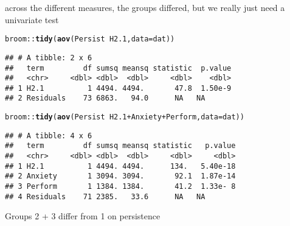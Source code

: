 \documentclass{article}\usepackage[]{graphicx}\usepackage[]{color}
\makeatletter
\newcommand{\hlopt}[1]{\textcolor[rgb]{0,0,0}{#1}}%
\newcommand{\hlstd}[1]{\textcolor[rgb]{0.345,0.345,0.345}{#1}}%
\newcommand{\hlkwc}[1]{\textcolor[rgb]{0.333,0.667,0.333}{#1}}%
\newcommand{\hlkwd}[1]{\textcolor[rgb]{0.737,0.353,0.396}{\textbf{#1}}}%
\newenvironment{kframe}{%
 \def\at@end@of@kframe{}%
 \ifinner\ifhmode%
  \def\at@end@of@kframe{\end{minipage}}%
  \begin{minipage}{\columnwidth}%
 \fi\fi%
 \def\FrameCommand##1{\hskip\@totalleftmargin \hskip-\fboxsep
 \colorbox{shadecolor}{##1}\hskip-\fboxsep
     \hskip-\linewidth \hskip-\@totalleftmargin \hskip\columnwidth}%
 \MakeFramed {\advance\hsize-\width
   \@totalleftmargin\z@ \linewidth\hsize
   \@setminipage}}%
 {\par\unskip\endMakeFramed%
 \at@end@of@kframe}
\newenvironment{knitrout}{}{} %
\makeatother
\begin{document}
across the different measures, the groups differed, but we really just need a univariate test

\begin{knitrout}
\color{fgcolor}\begin{kframe}
\begin{alltt}
\hlstd{broom}\hlopt{::}\hlkwd{tidy}\hlstd{(}\hlkwd{aov}\hlstd{(Persist} \hlopt{~} \hlstd{H2.1,} \hlkwc{data} \hlstd{= dat))}
\end{alltt}
\begin{verbatim}
## # A tibble: 2 x 6
##   term         df sumsq meansq statistic  p.value
##   <chr>     <dbl> <dbl>  <dbl>     <dbl>    <dbl>
## 1 H2.1          1 4494. 4494.       47.8  1.50e-9
## 2 Residuals    73 6863.   94.0      NA   NA
\end{verbatim}
\begin{alltt}
\hlstd{broom}\hlopt{::}\hlkwd{tidy}\hlstd{(}\hlkwd{aov}\hlstd{(Persist} \hlopt{~} \hlstd{H2.1} \hlopt{+} \hlstd{Anxiety} \hlopt{+} \hlstd{Perform,} \hlkwc{data} \hlstd{= dat))}
\end{alltt}
\begin{verbatim}
## # A tibble: 4 x 6
##   term         df sumsq meansq statistic   p.value
##   <chr>     <dbl> <dbl>  <dbl>     <dbl>     <dbl>
## 1 H2.1          1 4494. 4494.      134.   5.40e-18
## 2 Anxiety       1 3094. 3094.       92.1  1.87e-14
## 3 Perform       1 1384. 1384.       41.2  1.33e- 8
## 4 Residuals    71 2385.   33.6      NA   NA
\end{verbatim}
\end{kframe}
\end{knitrout}

Groups 2 + 3 differ from 1 on persistence
\end{document}

